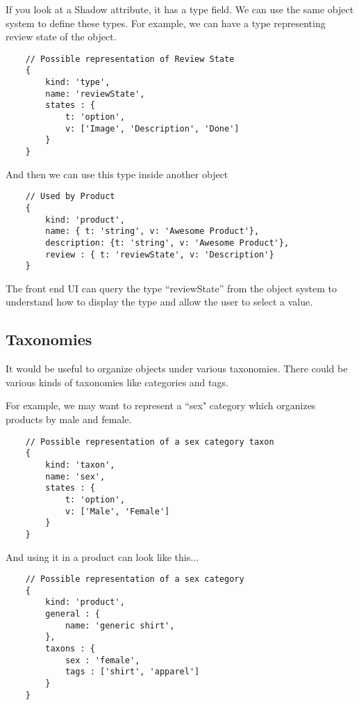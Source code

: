 \documentclass[11pt]{article}
\begin{document}
If you look at a Shadow attribute, it has a type field. We can use the same
object system to define these types. For example, we can have a type representing
review state of the object.

\begin{lstlisting}
    // Possible representation of Review State
    {
        kind: 'type',
        name: 'reviewState',
        states : { 
            t: 'option', 
            v: ['Image', 'Description', 'Done']
        }
    }
\end{lstlisting}

And then we can use this type inside another object  

\begin{lstlisting}
    // Used by Product
    {
        kind: 'product',
        name: { t: 'string', v: 'Awesome Product'},
        description: {t: 'string', v: 'Awesome Product'},
        review : { t: 'reviewState', v: 'Description'}
    }
\end{lstlisting}

The front end UI can query the type ``reviewState'' from the object system to 
understand how to display the type and allow the user to select a value.

\newpage
\subsection{Taxonomies}

It would be useful to organize objects under various taxonomies. There could be
various kinds of taxonomies like categories and tags. 

For example, we may want to represent a ``sex" category which organizes products
by male and female.

\begin{lstlisting}
    // Possible representation of a sex category taxon
    {
        kind: 'taxon',
        name: 'sex',
        states : { 
            t: 'option', 
            v: ['Male', 'Female']
        }
    }
\end{lstlisting}

And using it in a product can look like this...

\begin{lstlisting}
    // Possible representation of a sex category
    {
        kind: 'product',
        general : {
            name: 'generic shirt',
        },
        taxons : {
            sex : 'female',
            tags : ['shirt', 'apparel']
        }
    }
\end{lstlisting}
\end{document}
